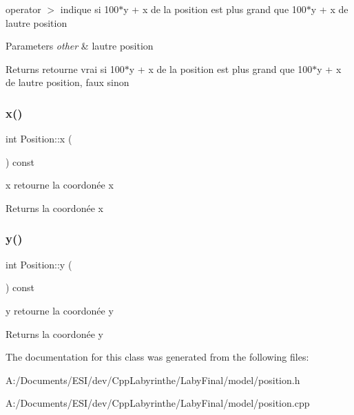operator $>$ indique si 100$\ast$y + x de la position est plus grand que 100$\ast$y + x de l\textquotesingle{}autre position 


\begin{DoxyParams}{Parameters}
{\em other} & l\textquotesingle{}autre position \\
\hline
\end{DoxyParams}
\begin{DoxyReturn}{Returns}
retourne vrai si 100$\ast$y + x de la position est plus grand que 100$\ast$y + x de l\textquotesingle{}autre position, faux sinon 
\end{DoxyReturn}
\mbox{\label{class_position_a085247752073466c9f5966c90a32a790}} 
\subsubsection{\texorpdfstring{x()}{x()}}
{\footnotesize\ttfamily int Position\+::x (\begin{DoxyParamCaption}{ }\end{DoxyParamCaption}) const\hspace{0.3cm}{\ttfamily [inline]}}



x retourne la coordonée x 

\begin{DoxyReturn}{Returns}
la coordonée x 
\end{DoxyReturn}
\mbox{\label{class_position_aca40f7c92b1c799d5add662bf2c5cc11}} 
\subsubsection{\texorpdfstring{y()}{y()}}
{\footnotesize\ttfamily int Position\+::y (\begin{DoxyParamCaption}{ }\end{DoxyParamCaption}) const\hspace{0.3cm}{\ttfamily [inline]}}



y retourne la coordonée y 

\begin{DoxyReturn}{Returns}
la coordonée y 
\end{DoxyReturn}


The documentation for this class was generated from the following files\+:\begin{DoxyCompactItemize}
\item 
A\+:/\+Documents/\+E\+S\+I/dev/\+Cpp\+Labyrinthe/\+Laby\+Final/model/position.\+h\item 
A\+:/\+Documents/\+E\+S\+I/dev/\+Cpp\+Labyrinthe/\+Laby\+Final/model/position.\+cpp\end{DoxyCompactItemize}
